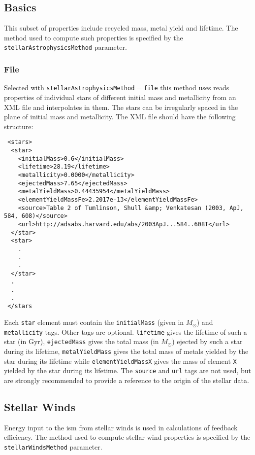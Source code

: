\subsection{Basics}

This subset of properties include recycled mass, metal yield and lifetime.  The method used to compute such properties is specified by the {\tt stellarAstrophysicsMethod} parameter.

\subsubsection{File}\label{sec:StellarAstrophysicsFile}

Selected with {\tt stellarAstrophysicsMethod}$=${\tt file} this method uses reads properties of individual stars of different initial mass and metallicity from an XML file and interpolates in them. The stars can be irregularly spaced in the plane of initial mass and metallicity. The XML file should have the following structure:
\begin{verbatim}
 <stars>
  <star>
    <initialMass>0.6</initialMass>
    <lifetime>28.19</lifetime>
    <metallicity>0.0000</metallicity>
    <ejectedMass>7.65</ejectedMass>
    <metalYieldMass>0.44435954</metalYieldMass>
    <elementYieldMassFe>2.2017e-13</elementYieldMassFe>
    <source>Table 2 of Tumlinson, Shull &amp; Venkatesan (2003, ApJ, 584, 608)</source>
    <url>http://adsabs.harvard.edu/abs/2003ApJ...584..608T</url>
  </star>
  <star>
    .
    .
    .
  </star>
  .
  .
  .
 </stars
\end{verbatim}
Each {\tt star} element must contain the {\tt initialMass} (given in $M_\odot$) and {\tt metallicity} tags. Other tags are optional. {\tt lifetime} gives the lifetime of such a star (in Gyr), {\tt ejectedMass} gives the total mass (in $M_\odot$) ejected by such a star during its lifetime, {\tt metalYieldMass} gives the total mass of metals yielded by the star during its lifetime while {\tt elementYieldMassX} gives the mass of element {\tt X} yielded by the star during its lifetime. The {\tt source} and {\tt url} tags are not used, but are strongly recommended to provide a reference to the origin of the stellar data.

\subsection{Stellar Winds}

Energy input to the \gls{ism} from stellar winds is used in calculations of feedback efficiency. The method used to compute stellar wind properties is specified by the {\tt stellarWindsMethod} parameter.

